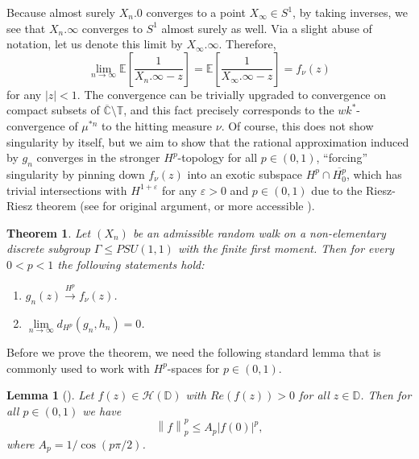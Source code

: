 \documentclass[11pt]{article}
\newtheorem{theorem}{Theorem}[section]
\newtheorem{lemma}{Lemma}[section]
\begin{document}
Because almost surely $X_n.0$ converges to a point $X_\infty \in S^1$, by taking inverses, we see that $X_n.\infty$ converges to $S^1$ almost surely as well. Via a slight abuse of notation, let us denote this limit by $X_\infty.\infty$. Therefore,
\[
\lim\limits_{n \rightarrow \infty} \mathbb{E} \left[\frac{1}{X_n.\infty - z}\right] = \mathbb{E} \left[\frac{1}{X_\infty.\infty - z}\right] = f_\nu(z)
\]
for any $|z| < 1$. The convergence can be trivially upgraded to convergence on compact subsets of $\overline{\mathbb{C}} \setminus \mathbb{T}$, and this fact precisely corresponds to the $wk^*$-convergence of $\mu^{*n}$ to the hitting measure $\nu$. Of course, this does not show singularity by itself, but we aim to show that the rational approximation induced by $g_n$ converges in the stronger $H^p$-topology for all $p \in (0, 1)$, ``forcing'' singularity by pinning down $f_\nu(z)$ into an exotic subspace $H^p \cap \overline{H^p_0}$, which has trivial intersections with $H^{1 + \varepsilon}$ for any $\varepsilon > 0$ and $p \in (0,1)$ due to the Riesz-Riesz theorem (see \cite[Theorem 1]{Ale79} for original argument, or more accessible \cite[Corollary 6.2.12]{cimahardy}). 

\begin{theorem}
	\label{convergence in H^p}
	Let $(X_n)$ be an admissible random walk on a non-elementary discrete subgroup $\Gamma \leq PSU(1,1)$ with the finite first moment. Then for every $0 < p < 1$ the following statements hold:
	\begin{enumerate}
		\item $g_n(z) \xrightarrow{H^p} f_\nu(z)$.		
		\item $\lim\limits_{n \rightarrow \infty} d_{H^p}(g_n, h_n) = 0$.
	\end{enumerate}
\end{theorem}

Before we prove the theorem, we need the following standard lemma that is commonly used to work with $H^p$-spaces for $p \in (0, 1)$.

\begin{lemma}[\cite{boundedgarnett}]
	\label{Hp estimate positive real}
	Let $f(z) \in \mathcal{H}(\mathbb{D})$ with $Re(f(z)) > 0$ for all $z \in \mathbb{D}$. Then for all $p \in (0, 1)$ we have
	\[
	\left\| f \right\|^p_p \le A_p |f(0)|^p,
	\]
	where $A_p = 1 / \cos(p \pi / 2)$. 
\end{lemma}
\end{document}
